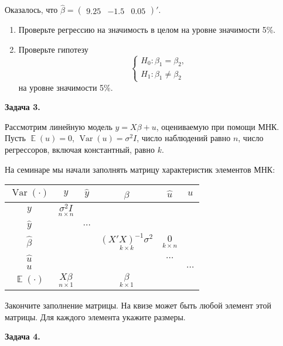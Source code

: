 \documentclass[10pt, a4paper]{extarticle}
\DeclareMathOperator{\Var}{Var}
\DeclareMathOperator{\E}{\mathbb{E}}
\begin{document}
	Оказалось, что $\hat{\beta} = \begin{pmatrix}
		9.25 & -1.5 & 0.05
	\end{pmatrix}'$.

	\begin{enumerate}[label=\alph*)]
		\item Проверьте регрессию на значимость в целом на уровне значимости 5\%.
		\item Проверьте гипотезу
		\[
		\begin{cases}
			H_0: \beta_1 = \beta_2, \\
			H_1: \beta_1 \ne \beta_2
		\end{cases}
		\]
		на уровне значимости 5\%.
	\end{enumerate}
	\vspace{1em}
	
	{\Large \textbf{Задача 3.}}
	
	Рассмотрим линейную модель $y = X\beta + u$, оцениваемую при помощи МНК. Пусть $\E(u) = 0$, $\Var(u) = \sigma^2 I$, число наблюдений равно $n$, число регрессоров, включая константный, равно $k$. 
	
	На семинаре мы начали заполнять матрицу характеристик элементов МНК:
	\begin{center}
		\begin{tabular}{c|ccccc}
			$\Var(\cdot)$ & $y$ & $\hat{y}$ & $\hat{\beta}$ & $\hat{u}$ & $u$ \\
			\hline
			$y$ & $\underset{n \times n}{\sigma^2I}$ &&&& \\
			$\hat{y}$ &&$\ldots$&&& \\
			$\hat{\beta}$ &&&$\underset{k\times k}{(X'X)^{-1}\sigma^2}$& $\underset{k \times n}{0}$& \\
			$\hat{u}$ &&&&$\ldots$& \\
			$u$ &&&&&$\ldots$ \\
			\hline
			$\E(\cdot)$ & $\underset{n\times1}{X\beta}$&&$\underset{k \times 1}{\beta}$&& \\
			\hline
		\end{tabular}
	\end{center}
	
	Закончите заполнение матрицы. На квизе может быть любой элемент этой матрицы. Для каждого элемента укажите размеры.
	\vspace{1em}
	
	{\Large \textbf{Задача 4.}}
	
\end{document}
